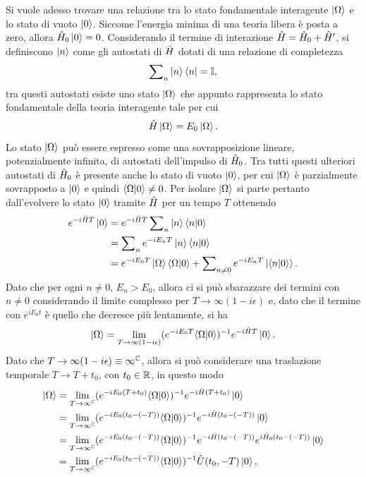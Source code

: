 Si vuole adesso trovare una relazione tra lo stato fondamentale interagente $\ket{\Omega}$ e lo stato di vuoto $\ket{0}$. Siccome l'energia minima di una teoria libera è posta a zero, allora $\hat{H}_0\ket{0} = 0$. Considerando il termine di interazione $\hat{H} = \hat{H}_0 + \hat{H}'$, si definiscono ${\ket{n}}$ come gli autostati di $\hat{H}$ dotati di una relazione di completezza 
\begin{equation}
    \sum\nolimits_n\ket{n}\bra{n} = \mathbb{I},
\end{equation}
tra questi autostati esiste uno stato $\ket{\Omega}$ che appunto rappresenta lo stato fondamentale della teoria interagente tale per cui
\begin{equation}
    \hat{H}\ket{\Omega} = E_0\ket{\Omega}.
\end{equation}
Lo stato $\ket{\Omega}$ può essere espresso come una sovrapposizione lineare, potenzialmente infinita, di autostati dell'impulso di $\hat{H}_0$. Tra tutti questi ulteriori autostati di $\hat{H}_0$ è presente anche lo stato di vuoto $\ket{0}$, per cui $\ket{\Omega}$ è parzialmente sovrapposto a $\ket{0}$ e quindi $\langle \Omega | 0 \rangle \neq 0$. Per isolare $\ket{\Omega}$ si parte pertanto dall'evolvere lo stato $\ket{0}$ tramite $\hat{H}$ per un tempo $T$ ottenendo
\begin{equation}
    \begin{split}
        e^{-i\hat{H} T}\ket{0} &= e^{-i\hat{H} T}\sum\nolimits_n\ket{n}\langle n | 0 \rangle \\
        &= \sum\nolimits_n e^{-iE_nT}\ket{n}\langle n | 0 \rangle \\
        &= e^{-iE_0T}\ket{\Omega}\langle \Omega | 0 \rangle + \sum\nolimits_{n\neq0}e^{-iE_nT}\ket{\langle n | 0 \rangle}.
    \end{split}
\end{equation}
Dato che per ogni $n\neq0$, $E_n > E_0$, allora ci si può sbarazzare dei termini con $n\neq0$ considerando il limite complesso per $T\to\infty(1 - i\epsilon)$ e, dato che il termine con $e^{iE_0t}$ è quello che decresce più lentamente, si ha
\begin{equation}
    \ket{\Omega} = \lim_{T\to\infty(1 - i\epsilon)}(e^{-iE_0T}\langle \Omega | 0 \rangle)^{-1}e^{-i\hat{H} T}\ket{0}.
\end{equation}
Dato che $T\to\infty(1 - i\epsilon) \equiv \infty^{\mathbb{C}}$, allora si può considerare una traslazione temporale $T\to T + t_0$, con $t_0\in\mathbb{R}$, in questo modo
\begin{equation}
    \begin{split}
        \ket{\Omega} &= \lim_{T\to\infty^{\mathbb{C}}}(e^{-iE_0(T + t_0)}\langle \Omega | 0 \rangle)^{-1}e^{-i\hat{H} (T + t_0)}\ket{0} \\
        &= \lim_{T\to\infty^{\mathbb{C}}}(e^{-iE_0(t_0 - (-T))}\langle \Omega | 0 \rangle)^{-1}e^{-i\hat{H} (t_0 - (-T))}\ket{0} \\
        &= \lim_{T\to\infty^{\mathbb{C}}}(e^{-iE_0(t_0 - (-T))}\langle \Omega | 0 \rangle)^{-1}e^{-i\hat{H} (t_0 - (-T))}e^{i\hat{H}_0(t_0 - (-T))}\ket{0} \\
        &= \lim_{T\to\infty^{\mathbb{C}}}(e^{-iE_0(t_0 - (-T))}\langle \Omega | 0 \rangle)^{-1}\hat{U}(t_0,-T)\ket{0},
    \end{split}
\end{equation}
